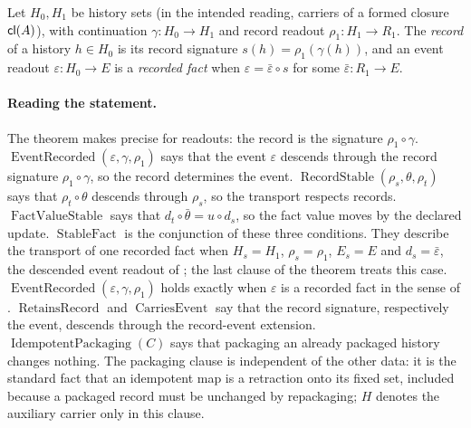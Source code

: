 \begin{definition}\label{def:record-formation}
Let \(H_0,H_1\) be history sets (in the intended reading, carriers of a
formed closure \(\mathsf{cl}(A)\)), with continuation
\(\gamma:H_0\to H_1\) and record readout \(\rho_1:H_1\to R_1\). The
\emph{record} of a history \(h\in H_0\) is its record signature
\(s(h)=\rho_1(\gamma(h))\), and an event readout \(\varepsilon:H_0\to E\) is a
\emph{recorded fact} when \(\varepsilon=\bar\varepsilon\circ s\) for some
\(\bar\varepsilon:R_1\to E\).
\end{definition}

\paragraph{Reading the statement.} The theorem makes
 precise for readouts: the record is the
signature \(\rho_1\circ\gamma\).
\(\operatorname{EventRecorded}(\varepsilon,\gamma,\rho_1)\) says that
the event \(\varepsilon\) descends through the record signature
\(\rho_1\circ\gamma\), so the record determines the event.
\(\operatorname{RecordStable}(\rho_s,\theta,\rho_t)\) says that
\(\rho_t\circ\theta\) descends through \(\rho_s\), so the transport
respects records. \(\operatorname{FactValueStable}\) says that
\(d_t\circ\bar\theta=u\circ d_s\), so the fact value moves by the
declared update. \(\operatorname{StableFact}\) is the conjunction of these
three conditions.  They describe the transport of one recorded fact when
\(H_s=H_1\), \(\rho_s=\rho_1\), \(E_s=E\) and \(d_s=\bar\varepsilon\), the
descended event readout of ; the last clause
of the theorem treats this case.  \(\operatorname{EventRecorded}(\varepsilon,\gamma,\rho_1)\)
holds exactly when \(\varepsilon\) is a recorded fact in the sense of
.
\(\operatorname{RetainsRecord}\) and \(\operatorname{CarriesEvent}\) say
that the record signature, respectively the event, descends through
the record-event extension. \(\operatorname{IdempotentPackaging}(C)\)
says that packaging an already packaged history changes nothing. The
packaging clause is independent of the other data: it is the standard fact
that an idempotent map is a retraction onto its fixed set, included because a
packaged record must be unchanged by repackaging; \(H\) denotes the auxiliary
carrier only in this clause.

